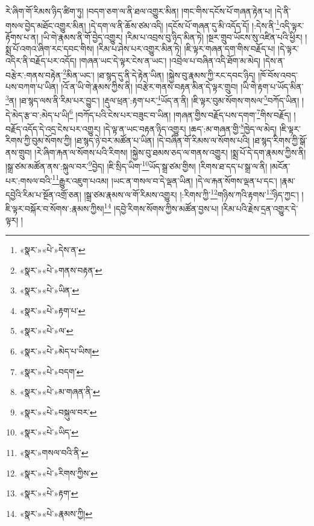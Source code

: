 རེ་ཞིག་གོ་རིམས་ཉིད་ཚིག་ཏུ། །བདག་ཅག་ལ་ནི་ཐལ་འགྱུར་མིན། །གང་གིས་དངོས་པོ་གཞན་རྟེན་པ། །དེ་ནི་གསལ་བྱེད་མཐོང་འགྱུར་མིན། །དེ་དག་ལ་ནི་ཆོས་ཙམ་འདི། །དངོས་པོ་གཞན་དུ་མི་འདོད་དོ། །:དེས་ནི་\footnote{«སྣར་»«པེ་»དེས་ན་}འདི་ལྟར་རྟོགས་པ་ན། །ཡི་གེ་རྣམས་ནི་གོ་བྱེད་འགྱུར། །རིམ་པ་འབྲས་བུ་ཉིད་མིན་ཏེ། །སྔར་གྲུབ་ཡོངས་སུ་འཛིན་པའི་ཕྱིར། །སྨྲ་པོ་འགའ་ཞིག་རང་དབང་གིས། །རིམ་པ་ཤེས་པར་འགྱུར་མིན་ཏེ། །ཇི་ལྟར་གཞན་དག་གིས་བརྗོད་པ། །དེ་ལྟར་འདིར་ནི་བརྗོད་པར་འདོད། །གཞན་ཡང་དེ་ལྟར་ངེས་ན་ཡང་། །འབྲེལ་པ་བཞིན་འདི་ཐོག་མ་མེད། །དེས་ན་བརྩེར་:གནས་བརྟེན་\footnote{«སྣར་»«པེ་»གནས་བརྟན་}མིན་ཡང་། །ཐ་སྙད་དུ་ནི་དེ་རྟེན་ཡིན། །སྐྱེས་བུ་རྣམས་ཀྱི་རང་དབང་ཉིད། །ཁོ་བོས་འབད་པས་བཀག་པ་ཡིན། །འོ་ན་ཡི་གེ་རྣམས་ཀྱིས་ནི། །བརྩེར་གནས་བརྟན་མིན་དེ་ལྟར་གྲུབ། །ཡི་གེ་རྟག་པ་ཡོད་མིན་\footnote{«སྣར་»«པེ་»ཡིན་}ན། །ཐ་སྙད་ལས་ནི་རིམ་པར་བྱུང་། །རྡུལ་ཕྲན་:རྟག་པར་\footnote{«སྣར་»«པེ་»རྟག་པ་}ཡོད་ན་ནི། །ཇི་ལྟར་བུམ་སོགས་གསལ་\footnote{«སྣར་»«པེ་»ལ་}བཀོད་ཡིན། །དེ་མེད་རྩ་བ་:མེད་པ་ཡི།\footnote{«སྣར་»«པེ་»མེད་པ་ཡིས།} །བཀོད་པའི་ངེས་པར་བཟུང་བ་ཡིན། །གཞན་གྱིས་བརྗོད་པས་དགག་\footnote{«སྣར་»«པེ་»བདག་}གིས་བརྗོད། །བརྗོད་འདོད་དེ་འདྲ་ངེས་པར་འགྱུར། །དེ་ལྟ་ན་ཡང་བརྟན་ཉིད་འགྱུར། །ཆད་:མ་གཞན་གྱི་\footnote{«སྣར་»«པེ་»མ་གཞན་ནི་}ཁྱེད་ལ་མེད། །ཇི་ལྟར་རིགས་ཀྱི་བུམ་སོགས་ཀྱི། །ཐ་སྙད་ཉེ་བར་མཚོན་པ་ཡིན། །དེ་བཞིན་གོ་རིམས་ལ་སོགས་པའི། །ཐ་སྙད་རིགས་ཀྱི་སྒོ་ནས་གྲུབ། །རེ་ཞིག་རྐན་ལ་སོགས་པའི་རིགས། །སྐྱེས་བུ་ཐམས་ཅད་ལ་གནས་འགྱུར། །སྨྲ་པོ་དེ་དག་རྣམས་ཀྱིས་ནི། །སྒྲ་ཙམ་མཚོན་ནས་:སྐུལ་བར་\footnote{«སྣར་»«པེ་»བསྐུལ་བར་}བྱེད། །ཇི་སྲིད་ཡིག་\footnote{«སྣར་»«པེ་»ཡིད་}ཡོད་སྒྲ་ཙམ་གྱིས། །རིགས་ཐ་དད་པ་སྒྲ་ལ་ནི། །མངོན་པར་:གསལ་བའི་\footnote{«སྣར་»གསལ་བའི་ནི་}རྒྱུར་འཇུག་པའམ། །ཡང་ན་གསལ་བ་དེ་ལྡན་ཡིན། །དེ་ལ་རྐན་སོགས་ལྡན་པ་དང་། །རྣམ་དབྱེའི་རིམ་པ་སྔོན་འགྲོ་ཅན། །སྒྲ་ཙམ་རྣམས་ལ་གོ་རིམས་འགྱུར། །:རིགས་ཀྱི་\footnote{«སྣར་»«པེ་»རིགས་ཀྱིས་}གཉིས་ཀའི་རྟགས་\footnote{«སྣར་»«པེ་»རྟག་}ཉིད་ཀྱང་། །ཇི་ལྟར་བསྐོར་བ་སོགས་:རྣམས་ཀྱིས།\footnote{«སྣར་»«པེ་»རྣམས་ཀྱི།} །དབྱེ་རིགས་སོགས་ཀྱིས་མཚོན་བྱས་པ། །རིམ་པའི་རྗེས་དྲན་འགྱུར་དེ་ལྟར། །
